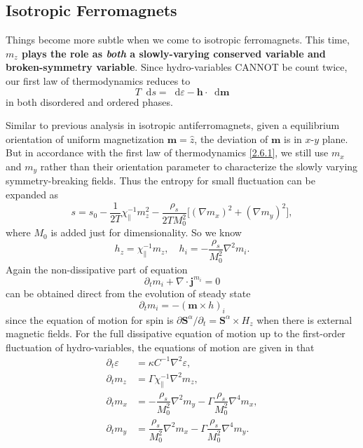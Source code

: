 \documentclass[10pt,nofootinbib]{revtex4}
\newcommand*\dd{\mathop{}\!\mathrm{d}}
\begin{document}
	\subsection{Isotropic Ferromagnets}
		Things become more subtle when we come to isotropic ferromagnets. This time, \textbf{$m_z$ plays the role as \emph{both} a slowly-varying conserved variable and broken-symmetry variable}. Since hydro-variables CANNOT be count twice, our first law of thermodynamics reduces to
		\begin{equation}\label{2.6.1}
			T\dd s=\dd \varepsilon-\bm{h}\cdot\dd\bm{m}
		\end{equation}
		in both disordered and ordered phases.\par
		Similar to previous analysis in isotropic antiferromagnets, given a equilibrium orientation of uniform magnetization $\bm{m}=\hat{z}$, the deviation of $\bm{m}$ is in $x$-$y$ plane. But in accordance with the first law of thermodynamics \eqref{2.6.1}, we still use $m_x$ and $m_y$ rather than their orientation parameter to characterize the slowly varying symmetry-breaking fields. Thus the entropy for small fluctuation can be expanded as
		\begin{equation}\label{2.6.2}
			s=s_0-\dfrac{1}{2T}\chi_\parallel^{-1}m_z^2-\dfrac{\rho_s}{2T M_0^2}\bigg[(\nabla m_x)^2+(\nabla m_y)^2\bigg],
		\end{equation}
		where $M_0$ is added just for dimensionality. So we know
		\begin{equation*}
			h_z=\chi_\parallel^{-1}m_z,\quad h_i=-\dfrac{\rho_s}{M_0^2}\nabla^2m_i.
		\end{equation*}
		Again the non-dissipative part of equation
		\begin{equation}\label{2.6.3}
			\partial_t m_i+\nabla\cdot\bm{j}^{m_i}=0
		\end{equation}
		can be obtained direct from the evolution of steady state 
		\begin{equation}\label{2.6.4}
			\partial_tm_i=-(\bm{m}\times h)_i
		\end{equation}
		since the equation of motion for spin is $\partial \bm{S}^\alpha/\partial_t=\bm{S}^\alpha\times H_z$ when there is external magnetic fields. For the full dissipative equation of motion up to the first-order fluctuation of hydro-variables, the equations of motion are given in \cite{chaikin2000principles} that
		\begin{align}
			\partial_t \varepsilon&=\kappa C^{-1}\nabla^2 \varepsilon,\label{2.6.5}\\
			\partial_t m_z&=\Gamma\chi_\parallel^{-1}\nabla^2 m_z,\label{2.6.6}\\
			\partial_t m_x&=-\dfrac{\rho_s}{M_0^2}\nabla^2 m_y-\Gamma\dfrac{\rho_s}{M_0^2}\nabla^4 m_x,\label{2.6.7}\\
			\partial_t m_y&=\dfrac{\rho_s}{M_0^2}\nabla^2 m_x-\Gamma\dfrac{\rho_s}{M_0^2}\nabla^4 m_y.\label{2.6.8}
		\end{align}
\end{document}

